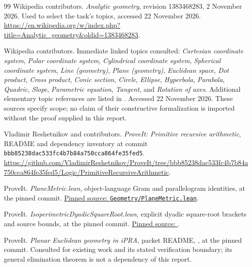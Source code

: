 \begin{thebibliography}{99}
Wikipedia contributors. \emph{Analytic geometry}, revision 1383468283,
2 November 2026. Used to select the task's topics, accessed 22 November 2026.
\url{https://en.wikipedia.org/w/index.php?title=Analytic_geometry&oldid=1383468283}.

Wikipedia contributors. Immediate linked topics consulted: \emph{Cartesian
coordinate system}, \emph{Polar coordinate system}, \emph{Cylindrical coordinate
system}, \emph{Spherical coordinate system}, \emph{Line (geometry)},
\emph{Plane (geometry)}, \emph{Euclidean space}, \emph{Dot product},
\emph{Cross product}, \emph{Conic section}, \emph{Circle}, \emph{Ellipse},
\emph{Hyperbola}, \emph{Parabola}, \emph{Quadric}, \emph{Slope},
\emph{Parametric equation}, \emph{Tangent}, and \emph{Rotation of axes}.
Additional elementary topic references are listed in
. Accessed 22 November 2026.
These sources specify scope; no claim of their constructive formalization
is imported without the proof supplied in this report.

Vladimir Reshetnikov and contributors. \emph{ProveIt: Primitive recursive
arithmetic}, README and dependency inventory at commit
\texttt{bbb85238dac533fc4b7b84a750cca864fe35fed5}.
\url{https://github.com/VladimirReshetnikov/ProveIt/tree/bbb85238dac533fc4b7b84a750cca864fe35fed5/Logic/PrimitiveRecursiveArithmetic}.

ProveIt. \emph{PlaneMetric.lean}, object-language Gram and parallelogram
identities, at the pinned commit.
\href{https://github.com/VladimirReshetnikov/ProveIt/blob/bbb85238dac533fc4b7b84a750cca864fe35fed5/Logic/PrimitiveRecursiveArithmetic/Derivations/Lean/IPRADerivations/Geometry/PlaneMetric.lean}{Pinned source: \texttt{Geometry/PlaneMetric.lean}}.

ProveIt. \emph{IsoperimetricDyadicSquareRoot.lean}, explicit dyadic
square-root brackets and source bounds, at the pinned commit.
\href{https://github.com/VladimirReshetnikov/ProveIt/blob/bbb85238dac533fc4b7b84a750cca864fe35fed5/Logic/PrimitiveRecursiveArithmetic/Derivations/Lean/IPRADerivations/Geometry/IsoperimetricDyadicSquareRoot.lean}{Pinned source: }.

ProveIt. \emph{Planar Euclidean geometry in iPRA}, packet README,
,
at the pinned commit. Consulted for existing work and its stated verification
boundary; its general elimination theorem is not a dependency of this report.


\end{thebibliography}
